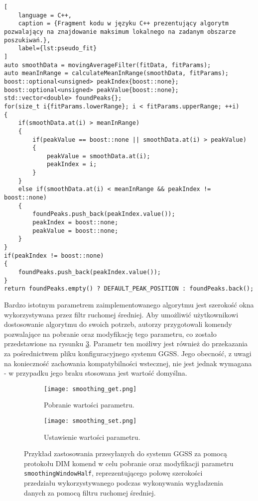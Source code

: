 \begin{lstlisting}[
    language = C++,
    caption = {Fragment kodu w języku C++ prezentujący algorytm pozwalający na znajdowanie maksimum lokalnego na zadanym obszarze poszukiwań.},
    label={lst:pseudo_fit}
]
auto smoothData = movingAverageFilter(fitData, fitParams);
auto meanInRange = calculateMeanInRange(smoothData, fitParams);
boost::optional<unsigned> peakIndex{boost::none};
boost::optional<unsigned> peakValue{boost::none};
std::vector<double> foundPeaks{};
for(size_t i{fitParams.lowerRange}; i < fitParams.upperRange; ++i)
{
    if(smoothData.at(i) > meanInRange)
    {
        if(peakValue == boost::none || smoothData.at(i) > peakValue)
        {
            peakValue = smoothData.at(i);
            peakIndex = i;
        }
    }
    else if(smoothData.at(i) < meanInRange && peakIndex != boost::none)
    {
        foundPeaks.push_back(peakIndex.value());
        peakIndex = boost::none;
        peakValue = boost::none;
    }
}
if(peakIndex != boost::none)
{
    foundPeaks.push_back(peakIndex.value());
}
return foundPeaks.empty() ? DEFAULT_PEAK_POSITION : foundPeaks.back();
\end{lstlisting}

Bardzo istotnym parametrem zaimplementowanego algorytmu jest szerokość okna wykorzystywana przez filtr ruchomej średniej. Aby umożliwić użytkownikowi dostosowanie algorytmu do swoich potrzeb, autorzy przygotowali komendy pozwalające na pobranie oraz modyfikację tego parametru, co zostało przedstawione na rysunku \ref{fig:smoothing_param}. Parametr ten możliwy jest również do przekazania za pośrednictwem pliku konfiguracyjnego systemu GGSS. Jego obecność, z uwagi na konieczność zachowania kompatybilności wstecznej, nie jest jednak wymagana - w przypadku jego braku stosowana jest wartość domyślna.

\begin{figure}[H]
\centering

\begin{subfigure}{0.45\textwidth}
\centering
\texttt{[image: smoothing\_get.png]}
\caption{Pobranie wartości parametru.}
\label{fig:smoothing_get}
\end{subfigure}
\begin{subfigure}{0.45\textwidth}
\centering
\texttt{[image: smoothing\_set.png]}
\caption{Ustawienie wartości parametru.}
\label{fig:smoothing_set}
\end{subfigure}

\caption{Przykład zastosowania przesyłanych do systemu GGSS za pomocą protokołu DIM komend w celu pobranie oraz modyfikacji parametru \lstinline{smoothingWindowHalf}, reprezentującego połowę szerokości przedziału wykorzystywanego podczas wykonywania wygładzenia danych za pomocą filtru ruchomej średniej.}
\label{fig:smoothing_param}
\end{figure}

